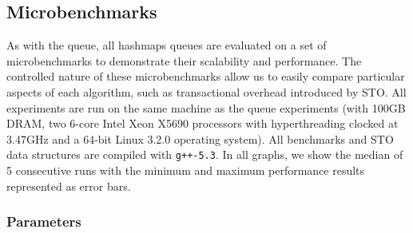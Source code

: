 \subsection{Microbenchmarks}
As with the queue, all hashmaps queues are evaluated on a set of microbenchmarks to demonstrate their scalability and performance. The controlled nature of these microbenchmarks allow us to easily compare particular aspects of each algorithm, such as transactional overhead introduced by STO. All experiments are run on the same machine as the queue experiments (with 100GB DRAM, two 6-core Intel Xeon X5690 processors with hyperthreading clocked at 3.47GHz and a 64-bit Linux 3.2.0 operating system). All benchmarks and STO data structures are compiled with \texttt{g++-5.3}. In all graphs, we show the median of 5 consecutive runs with the minimum and maximum performance results represented as error bars.

\subsubsection{Parameters}

